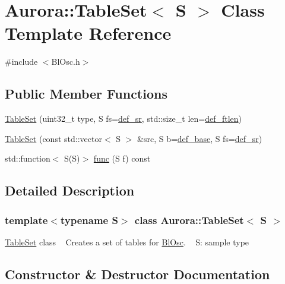 \hypertarget{class_aurora_1_1_table_set}{}\section{Aurora\+:\+:Table\+Set$<$ S $>$ Class Template Reference}
\label{class_aurora_1_1_table_set}


{\ttfamily \#include $<$Bl\+Osc.\+h$>$}

\subsection*{Public Member Functions}
\begin{DoxyCompactItemize}
\item 
\hyperlink{class_aurora_1_1_table_set_a0be4528b972606335d73ac312da6337b}{Table\+Set} (uint32\+\_\+t type, S fs=\hyperlink{namespace_aurora_ad49263d809bea98dd422e95bc91bc03e}{def\+\_\+sr}, std\+::size\+\_\+t len=\hyperlink{namespace_aurora_a14dabfd9feedfa09c0e6f86d2627f006}{def\+\_\+ftlen})
\item 
\hyperlink{class_aurora_1_1_table_set_a884ecfde480fdac4c32fa10a82286941}{Table\+Set} (const std\+::vector$<$ S $>$ \&src, S b=\hyperlink{namespace_aurora_acb267dff62f74484893c2d5b679b78bf}{def\+\_\+base}, S fs=\hyperlink{namespace_aurora_ad49263d809bea98dd422e95bc91bc03e}{def\+\_\+sr})
\item 
std\+::function$<$ S(S)$>$ \hyperlink{class_aurora_1_1_table_set_a27a325a2c3c4b8cd50e0c86d6ac3c617}{func} (S f) const
\end{DoxyCompactItemize}


\subsection{Detailed Description}
\subsubsection*{template$<$typename S$>$\newline
class Aurora\+::\+Table\+Set$<$ S $>$}

\hyperlink{class_aurora_1_1_table_set}{Table\+Set} class ~\newline
Creates a set of tables for \hyperlink{class_aurora_1_1_bl_osc}{Bl\+Osc}. ~\newline
S\+: sample type 

\subsection{Constructor \& Destructor Documentation}
\mbox{\label{class_aurora_1_1_table_set_a0be4528b972606335d73ac312da6337b}} 
